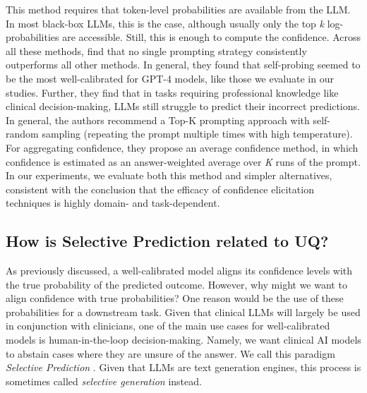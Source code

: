 This method requires that token-level probabilities are available from the LLM. In most black-box LLMs, this is the case, although usually only the top \emph{k} log-probabilities are accessible. Still, this is enough to compute the confidence. Across all these methods, \citet{xiong2024can} find that no single prompting strategy consistently outperforms all other methods. In general, they found that self-probing seemed to be the most well-calibrated for GPT-4 models, like those we evaluate in our studies. Further, they find that in tasks requiring professional knowledge like clinical decision-making, LLMs still struggle to predict their incorrect predictions. In general, the authors recommend a Top-K prompting approach  with self-random sampling (repeating the prompt multiple times with high temperature). For aggregating confidence, they propose an average confidence method, in which confidence is estimated as an answer-weighted average over \emph{K} runs of the prompt.  In our experiments, we evaluate both this method and simpler alternatives, consistent with the conclusion that the efficacy of confidence elicitation techniques is highly domain- and task-dependent.

\subsection{How is Selective Prediction related to UQ?}
As previously discussed, a well-calibrated model aligns its confidence levels with the true probability of the predicted outcome. However, why might we want to align confidence with true probabilities? One reason would be the use of these probabilities for a downstream task. Given that clinical LLMs will largely be used in conjunction with clinicians, one of the main use cases for well-calibrated models is human-in-the-loop decision-making. Namely, we want clinical AI models to abstain cases where they are unsure of the answer. We call this paradigm \emph{Selective Prediction} \citep{varshney-etal-2022-investigating, xin-etal-2021-art}. Given that LLMs are text generation engines, this process is sometimes called \emph{selective generation} instead. 

